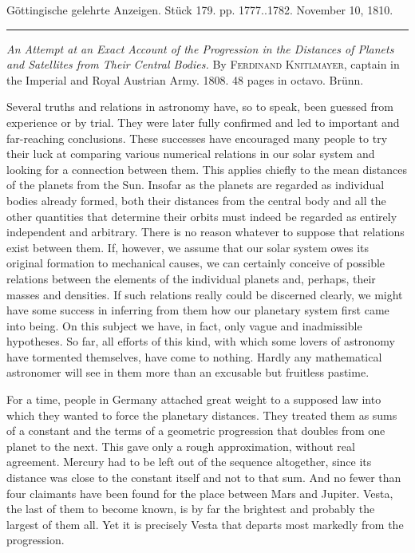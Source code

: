 \hypertarget{native-533-lower}{}\label{native-533-lower}
\begin{center}\small Göttingische gelehrte Anzeigen. Stück 179. pp. 1777..1782. November 10, 1810.\\[3pt]\rule{.72\linewidth}{.3pt}\end{center}

\emph{An Attempt at an Exact Account of the Progression in the Distances of Planets and Satellites from Their Central Bodies.} By \textsc{Ferdinand Knitlmayer}, captain in the Imperial and Royal Austrian Army. 1808. 48 pages in octavo. Brünn.

Several truths and relations in astronomy have, so to speak, been guessed from experience or by trial. They were later fully confirmed and led to important and far-reaching conclusions. These successes have encouraged many people to try their luck at comparing various numerical relations in our solar system and looking for a connection between them. This applies chiefly to the mean distances of the planets from the Sun. Insofar as the planets are regarded as individual bodies already formed, both their distances from the central body and all the other quantities that determine their orbits must indeed be regarded as entirely independent and arbitrary. There is no reason whatever to suppose that relations exist between them. If, however, we assume that our solar system owes its original formation to mechanical causes, we can certainly conceive of possible relations between the elements of the individual planets and, perhaps, their masses and densities. If such relations really could be discerned clearly, we might have some success in inferring from them how our planetary system first came into being. On this subject we have, in fact, only vague and inadmissible hypotheses. So far, all efforts of this kind, with which some lovers of astronomy have tormented themselves, have come to nothing. Hardly any mathematical astronomer will see in them more than an excusable but fruitless pastime.

For a time, people in Germany attached great weight to a supposed law into which they wanted to force the planetary distances. They treated them as sums of a constant and the terms of a geometric progression that doubles from one planet to the next. This gave only a rough approximation, without real agreement. Mercury had to be left out of the sequence altogether, since its distance was close to the constant itself and not to that sum. And no fewer than four claimants have been found for the place between Mars and Jupiter. Vesta, the last of them to become known, is by far the brightest and probably the largest of them all. Yet it is precisely Vesta that departs most markedly from the progression.

